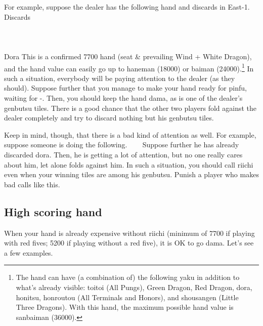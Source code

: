 \bigskip
For example, suppose the dealer has the following hand and discards in East-1. 
\bp
\vspace{-20pt}
{\small Discards}\\ \vspace{-10pt}
\xi{}\\
\vspace{-10pt}
\hspace{-45pt}\\
\vspace{-10pt}
\ep
\bp
{}
\rbai\bai\bai~~\dong\dong\rdong~~\\
\hspace{330pt}\footnotesize{\jap Dora}
\ep
This is a confirmed 7700 hand (seat \& prevailing Wind + White Dragon), and the hand value can easily go up to {\jap haneman} (18000) or {\jap baiman} (24000).\footnote{The hand can have (a combination of) the following {\jap yaku} in addition to what's already visible: {\jap toitoi} (All Pungs), Green Dragon, Red Dragon, {\jap dora}, {\jap honitsu}, {\jap honroutou} (All Terminals and Honors), and {\jap shousangen} (Little Three Dragons). With this hand, the maximum possible hand value is {\jap sanbaiman} (36000).} 
In such a situation, everybody will be paying attention to the dealer (as they should). Suppose further that you manage to make your hand ready for {\jap pinfu}, waiting for {\large{}-}. Then, you should keep the hand {\jap dama}, as {\large{}} is one of the dealer's {\jap genbutsu} tiles. There is a good chance that the other two players fold against the dealer completely and try to discard nothing but his {\jap genbutsu} tiles. 

\bigskip

Keep in mind, though, that there is a bad kind of attention as well. For example, suppose someone is doing the following.
\bp
{} ~\zhong\zhong\rzhong~~
\ep
Suppose further he has already discarded {\jap dora}. Then, he is getting a lot of attention, but no one really cares about him, let alone folds against him. In such a situation, you should call {\jap riichi} even when your winning tiles are among his {\jap genbutsu}. Punish a player who makes bad calls like this.

\subsection{High scoring hand} \label{sec:high}
When your hand is already expensive without {\jap riichi} (minimum of 7700 if playing with red fives; 5200 if playing without a red five), it is OK to go {\jap dama}. Let's see a few examples. 

